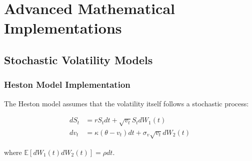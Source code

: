 \documentclass[12pt,a4paper]{article}
\theoremstyle{definition}
\theoremstyle{remark}
\begin{document}
\section{Advanced Mathematical Implementations}

\subsection{Stochastic Volatility Models}

\subsubsection{Heston Model Implementation}

The Heston model assumes that the volatility itself follows a stochastic process:

\begin{align}
dS_t &= rS_t dt + \sqrt{v_t}S_t dW_1(t) \\
dv_t &= \kappa(\theta - v_t)dt + \sigma_v\sqrt{v_t}dW_2(t)
\end{align}

where $\mathbb{E}[dW_1(t)dW_2(t)] = \rho dt$.
\end{document}
